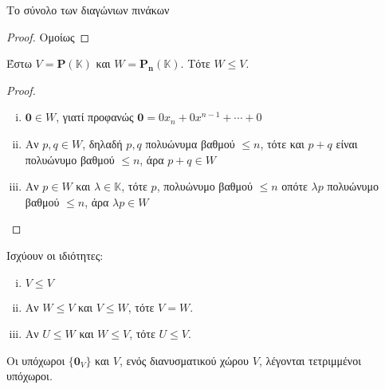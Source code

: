 \begin{example}
  \textcolor{Col2}{Το σύνολο των διαγώνιων πινάκων}

  \begin{proof}
    Ομοίως
  \end{proof}
\end{example}

\begin{example}
\item Έστω $ V = \mathbf{P}(\mathbb{K}) $ και 
  $ W = \mathbf{P_{n}}(\mathbb{K})$.  Τότε $ W \leq V $.  
  \begin{proof}
  \item {}
    \begin{enumerate}[i)]
      \item   $ \mathbf{0} \in W $, γιατί προφανώς 
        $ \mathbf{0} = 0 x_{n} + 0 x^{n-1} + \cdots + 0 $
      \item 
        Αν $ p, q \in W $, δηλαδή $ p,q $ πολυώνυμα βαθμού $ \leq n $, 
        τότε και $ p+q $ είναι πολυώνυμο βαθμού $ \leq n $, άρα 
        $p+q \in W$
      \item Αν $ p \in W $ και $ \lambda \in \mathbb{K} $, τότε 
        $p$, πολυώνυμο βαθμού $ \leq n $ οπότε $ \lambda p$ πολυώνυμο 
        βαθμού $ \leq n $, άρα $ \lambda p \in W $
    \end{enumerate}
  \end{proof}
\end{example}

\begin{prop}
  Ισχύουν οι ιδιότητες:
  \begin{enumerate}[i)]
    \item $ V \leq V $
    \item Αν $ W \leq V $ και $ V \leq W $, τότε $ V = W $.
    \item Αν $ U \leq W $ και $ W \leq V $, τότε $ U \leq V $.
  \end{enumerate}
\end{prop}

\begin{rem}
  Οι υπόχωροι $ \{ \mathbf{0}_{V} \} $ και $V$, ενός διανυσματικού χώρου $V$, 
  λέγονται \textcolor{Col2}{τετριμμένοι υπόχωροι}.
\end{rem}


